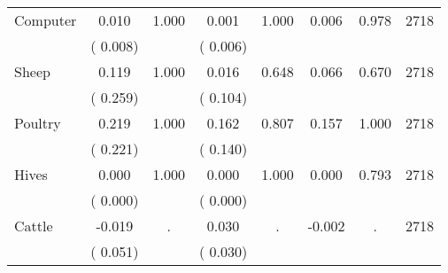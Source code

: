 \begin{tabular}{l*{7}{c}}
 Computer       &              0.010       &        1.000  &              0.001       &        1.000  &              0.006       &              0.978 &  2718 \\ 
                       &       (       0.008)             &                               &       (       0.006)                     &                               &                                               &                                &                      \\ 

 Sheep       &              0.119       &        1.000  &              0.016       &        0.648  &              0.066       &              0.670 &  2718 \\ 
                       &       (       0.259)             &                               &       (       0.104)                     &                               &                                               &                                &                      \\ 

 Poultry       &              0.219       &        1.000  &              0.162       &        0.807  &              0.157       &              1.000 &  2718 \\ 
                       &       (       0.221)             &                               &       (       0.140)                     &                               &                                               &                                &                      \\ 

 Hives       &              0.000       &        1.000  &              0.000       &        1.000  &              0.000       &              0.793 &  2718 \\ 
                       &       (       0.000)             &                               &       (       0.000)                     &                               &                                               &                                &                      \\ 

 Cattle       &             -0.019       &            .  &              0.030       &            .  &             -0.002       &                  . &  2718 \\ 
                       &       (       0.051)             &                               &       (       0.030)                     &                               &                                               &                                &                      \\ 


\end{tabular}
